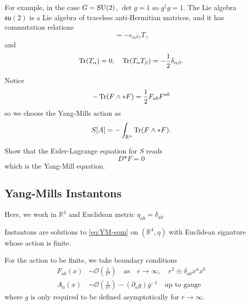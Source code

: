 \documentclass[a4paper,11pt]{article}
\begin{document}
    For example, in the case $G = \operatorname{SU}(2)$, $\det g = 1$ so $g^{\dagger} g = 1$. The Lie algebra $\mathfrak{su}(2)$ is a Lie algebra of traceless anti-Hermitian matrices, and it has commutation relations 
    \begin{equation}
        [T_\alpha, T_\beta] = - \epsilon_{\alpha \beta \gamma} T_\gamma
    \end{equation}
    and 
    \begin{equation}
        \Tr(T_\alpha) = 0, \quad \Tr(T_\alpha T_\beta) = -\frac{1}{2} \delta_{\alpha \beta}.
    \end{equation}

    \begin{nt}
        Notice 
        \begin{equation}
           - \Tr(F \wedge *F) = \frac{1}{2} F_{ab} F^{ab} 
        \end{equation}
        so we choose the Yang-Mills action as 
        \begin{equation}
            S[A] = - \int_{\mathbb{R}^n} \Tr(F \wedge * F). \label{eq:YM-action}
        \end{equation}
    \end{nt}

    \begin{exer}
        Show that the Euler-Lagrange equation for $S$ reads 
        \begin{equation}
            \boxed{D {*F} = 0} \label{eq:YM-eom}
        \end{equation}
        which is the Yang-Mill equation.
    \end{exer}

    \subsection{Yang-Mills Instantons} 
    Here, we work in $\mathbb{R}^4$ and Euclidean metric $\eta_{ab} = \delta_{ab}$. 
    \begin{defi}[Instanton]
        Instantons are solutions to \eqref{eq:YM-eom} on $(\mathbb{R}^4, \eta)$ with Euclidean signature whose action is finite. 
    \end{defi}

    For the action to be finite, we take boundary conditions
    \begin{equation}
        \begin{split}
            F_{ab}(x) & \sim \mathcal{O}\left( \frac{1}{r^3} \right) \quad \text{as} \quad r \to \infty, \quad r^2 \equiv \delta_{ab} x^a x^b\\
            A_a(x) & \sim \mathcal{O}\left( \frac{1}{r^2} \right) - (\partial_a g) g^{-1} \quad \text{up to gauge}
        \end{split}
    \end{equation}
    where $g$ is only required to be defined asymptotically for $r \to \infty$.
\end{document}
